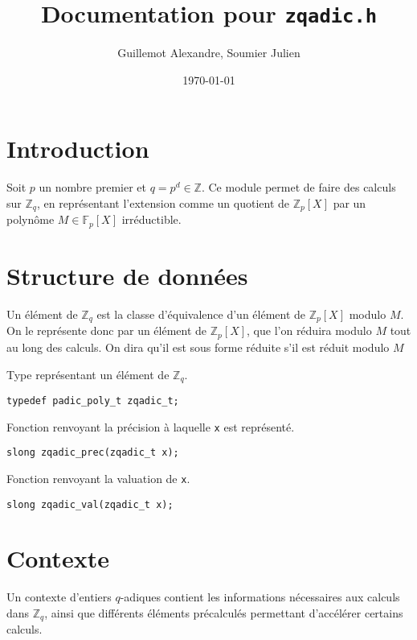 \documentclass[11pt]{article}
\begin{document}
\title{Documentation pour \texttt{zqadic.h}}
\date{\today}
\author{Guillemot Alexandre, Soumier Julien}
\maketitle

\tableofcontents

\section{Introduction}
Soit $p$ un nombre premier et $q = p^d \in \mathbb{Z}$. Ce module permet de faire des calculs sur $\mathbb{Z}_{q}$, en représentant l'extension comme un quotient de $\mathbb{Z}_p[X]$ par un polynôme $M \in \mathbb{F}_p[X]$ irréductible.


\section{Structure de données}
Un élément de $\mathbb{Z}_q$ est la classe d'équivalence d'un élément de $\mathbb{Z}_p[X]$ modulo $M$. On le représente donc par un élément de $\mathbb{Z}_p[X]$, que l'on réduira modulo $M$ tout au long des calculs. On dira qu'il est sous forme réduite s'il est réduit modulo $M$

Type représentant un élément de $\mathbb{Z}_q$. 
\begin{verbatim}
typedef padic_poly_t zqadic_t;
\end{verbatim}

Fonction renvoyant la précision à laquelle \texttt{x} est représenté. 
\begin{verbatim}
slong zqadic_prec(zqadic_t x);
\end{verbatim}

Fonction renvoyant la valuation de \texttt{x}. 
\begin{verbatim}
slong zqadic_val(zqadic_t x);
\end{verbatim}


\section{Contexte}
Un contexte d'entiers $q$-adiques contient les informations nécessaires aux calculs dans $\mathbb{Z}_q$, ainsi que différents éléments précalculés permettant d'accélérer certains calculs.
\end{document}
